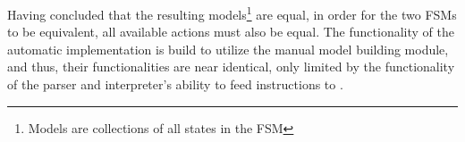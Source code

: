 Having concluded that the resulting models\footnote{Models are collections of all states in the FSM} are equal, in order for the two FSMs to be equivalent, all available actions must also be equal. The functionality of the automatic implementation is build to utilize the manual model building module, and thus, their functionalities are near identical, only limited by the functionality of the parser and interpreter's ability to feed instructions to .


